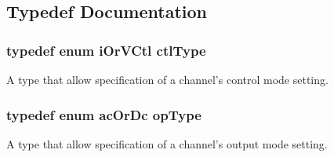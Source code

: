 \subsection{Typedef Documentation}
\hypertarget{a00020_a5cd368998e9721e657fd7bc6d413807a}{
\subsubsection[{ctl\-Type}]{\setlength{\rightskip}{0pt plus 5cm}typedef enum {\bf i\-Or\-V\-Ctl} {\bf ctl\-Type}}}\label{a00020_a5cd368998e9721e657fd7bc6d413807a}
A type that allow specification of a channel's control mode setting. \hypertarget{a00020_acd90d47e6937efc4183ab0d18f787575}{
\subsubsection[{op\-Type}]{\setlength{\rightskip}{0pt plus 5cm}typedef enum {\bf ac\-Or\-Dc} {\bf op\-Type}}}\label{a00020_acd90d47e6937efc4183ab0d18f787575}
A type that allow specification of a channel's output mode setting. 

